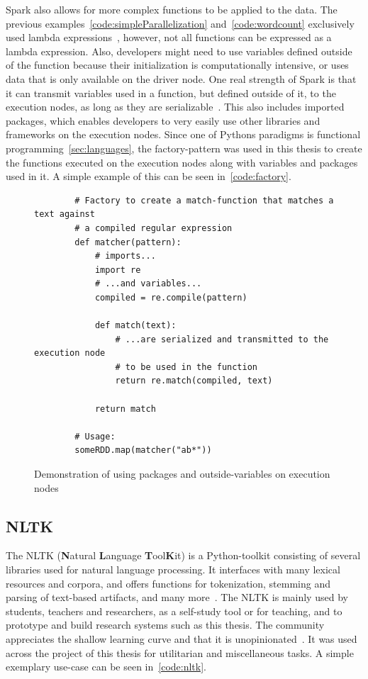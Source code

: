 Spark also allows for more complex functions to be applied to the data.
The previous examples~\autoref{code:simpleParallelization} and~\autoref{code:wordcount} exclusively used lambda expressions~\cite{pythonDocs},
however, not all functions can be expressed as a lambda expression.
Also, developers might need to use variables defined outside of the function because their initialization is computationally intensive,
or uses data that is only available on the driver node.
One real strength of Spark is that it can transmit variables used in a function, but defined outside of it, to the execution nodes, as long as they are serializable~\cite{sparkDocs}.
This also includes imported packages, which enables developers to very easily use other libraries and frameworks on the execution nodes.
Since one of Pythons paradigms is functional programming~\autoref{sec:languages},
the factory-pattern was used in this thesis to create the functions executed on the execution nodes along with variables and packages used in it.
A simple example of this can be seen in~\autoref{code:factory}.

\begin{figure}
    \caption{Demonstration of using packages and outside-variables on execution nodes}
    \label{code:factory}
    \begin{verbatim}
        # Factory to create a match-function that matches a text against
        # a compiled regular expression
        def matcher(pattern):
            # imports...
            import re
            # ...and variables...
            compiled = re.compile(pattern)

            def match(text):
                # ...are serialized and transmitted to the execution node
                # to be used in the function
                return re.match(compiled, text)

            return match

        # Usage:
        someRDD.map(matcher("ab*"))
    \end{verbatim}
\end{figure}

\subsection{NLTK}
\label{subsec:nltk}

The NLTK (\textbf{N}atural \textbf{L}anguage \textbf{T}ool\textbf{K}it) is a Python-toolkit consisting of several libraries used for
natural language processing.
It interfaces with many lexical resources and corpora, and offers functions for tokenization, stemming and parsing of text-based artifacts,
and many more~\cite{nltkDocs}.
The NLTK is mainly used by students, teachers and researchers, as a self-study tool or for teaching,
and to prototype and build research systems such as this thesis.
The community appreciates the shallow learning curve and that it is unopinionated~\cite{Bird2006}.
It was used across the project of this thesis for utilitarian and miscellaneous tasks.
A simple exemplary use-case can be seen in~\autoref{code:nltk}.

